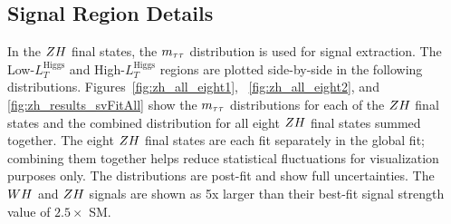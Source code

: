 \subsection{Signal Region Details}
\label{sec:vh_sr}

In the $ZH$ final states, the $m_{\tau\tau}$ distribution is
used for signal extraction. The Low-$L_{T}^{\textrm{Higgs}}$ and
High-$L_{T}^{\textrm{Higgs}}$ regions are plotted side-by-side
in the following distributions. Figures~\ref{fig:zh_all_eight1}, ~\ref{fig:zh_all_eight2}, 
and \ref{fig:zh_results_svFitAll} show the $m_{\tau\tau}$ distributions 
for each of the $ZH$ final states and the combined distribution for 
all eight $ZH$ final states summed together. The eight $ZH$ final states are each 
fit separately in the global fit; combining them together helps reduce statistical
fluctuations for visualization purposes only.
The distributions are post-fit and show full uncertainties.
The $WH$ and $ZH$ signals are shown as 5x larger than their best-fit
signal strength value of $2.5 \times$ SM.

